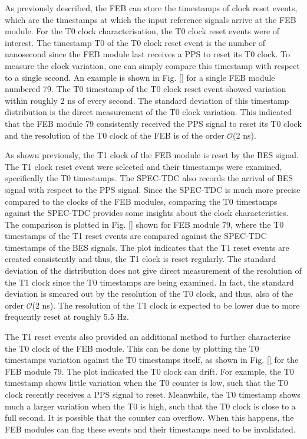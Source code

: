 
As previously described, the FEB can store the timestamps of clock reset events, which are the timestamps at which the input reference signals arrive at the FEB module.
For the T0 clock characterisation, the T0 clock reset events were of interest.
The timestamp T0 of the T0 clock reset event is the number of nanosecond since the FEB module last receives a PPS to reset its T0 clock.
To measure the clock variation, one can simply compare this timestamp with respect to a single second.
An example is shown in Fig. \ref{} for a single FEB module numbered 79.
The T0 timestamp of the T0 clock reset event showed variation within roughly 2 ns of every second. 
The standard deviation of this timestamp distribution is the direct measurement of the T0 clock variation.
This indicated that the FEB module 79 consistently received the PPS signal to reset its T0 clock and the resolution of the T0 clock of the FEB is of the order $\mathcal{O}$(2 ns).


As shown previously, the T1 clock of the FEB module is reset by the BES signal.
The T1 clock reset event were selected and their timestamps were examined, specifically the T0 timestamps.
The SPEC-TDC also records the arrival of BES signal with respect to the PPS signal.
Since the SPEC-TDC is much more precise compared to the clocks of the FEB modules, comparing the T0 timestamps against the SPEC-TDC provides some insights about the clock characteristics.
The comparison is plotted in Fig. \ref{} shown for FEB module 79, where the T0 timestamps of the T1 reset events are compared against the SPEC-TDC timestamps of the BES signals.
The plot indicates that the T1 reset events are created consistently and thus, the T1 clock is reset regularly.
The standard deviation of the distribution does not give direct measurement of the resolution of the T1 clock since the T0 timestamps are being examined. 
In fact, the standard deviation is smeared out by the resolution of the T0 clock, and thus, also of the order $\mathcal{O}$(2 ns).
The resolution of the T1 clock is expected to be lower due to more frequently reset at roughly 5.5 Hz.

The T1 reset events also provided an additional method to further characterise the T0 clock of the FEB module. 
This can be done by plotting the T0 timestamps variation against the T0 timestamps itself, as shown in Fig. \ref{} for the FEB module 79.
The plot indicated the T0 clock can drift.
For example, the T0 timestamp shows little variation when the T0 counter is low, such that the T0 clock recently receives a PPS signal to reset.
Meanwhile, the T0 timestamp shows much a larger variation when the T0 is high, such that the T0 clock is close to a full second.
It is possible that the counter can overflow.
When this happens, the FEB modules can flag these events and their timestamps need to be invalidated.

